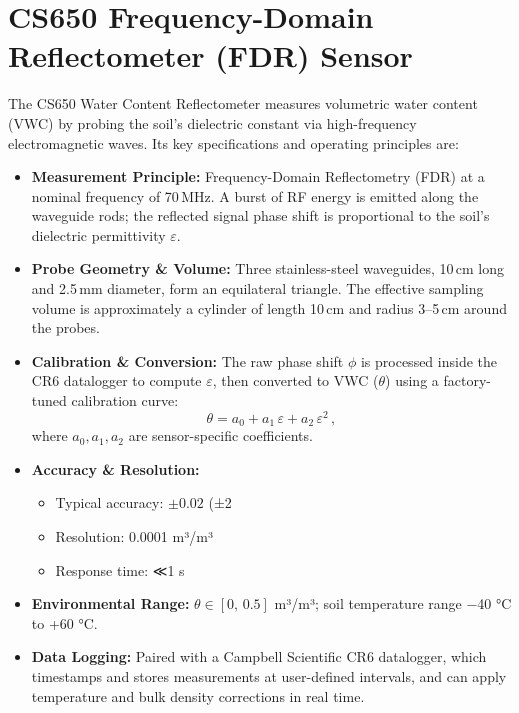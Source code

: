 \section*{CS650 Frequency-Domain Reflectometer (FDR) Sensor}

The CS650 Water Content Reflectometer measures volumetric water content (VWC) by probing the soil’s dielectric constant via high-frequency electromagnetic waves.  Its key specifications and operating principles are:

\begin{itemize}
  \item \textbf{Measurement Principle:}  
    Frequency-Domain Reflectometry (FDR) at a nominal frequency of 70\,MHz.  A burst of RF energy is emitted along the waveguide rods; the reflected signal phase shift is proportional to the soil’s dielectric permittivity \(\varepsilon\).

  \item \textbf{Probe Geometry \& Volume:}  
    Three stainless-steel waveguides, 10\,cm long and 2.5\,mm diameter, form an equilateral triangle.  
    The effective sampling volume is approximately a cylinder of length 10\,cm and radius 3–5\,cm around the probes.

  \item \textbf{Calibration \& Conversion:}  
    The raw phase shift \(\phi\) is processed inside the CR6 datalogger to compute \(\varepsilon\), then converted to VWC (\(\theta\)) using a factory-tuned calibration curve:
    \[
      \theta = a_0 + a_1\,\varepsilon + a_2\,\varepsilon^2\,,
    \]
    where \(a_0, a_1, a_2\) are sensor-specific coefficients.

  \item \textbf{Accuracy \& Resolution:}  
    \begin{itemize}
      \item Typical accuracy: \(\pm0.02\) (±2 %
      \item Resolution: 0.0001 m³/m³  
      \item Response time: ≪1 s
    \end{itemize}

  \item \textbf{Environmental Range:}  
    \(\theta\in[0,\,0.5]\) m³/m³; soil temperature range −40 °C to +60 °C.

  \item \textbf{Data Logging:}  
    Paired with a Campbell Scientific CR6 datalogger, which timestamps and stores measurements at user-defined intervals, and can apply temperature and bulk density corrections in real time.
\end{itemize}